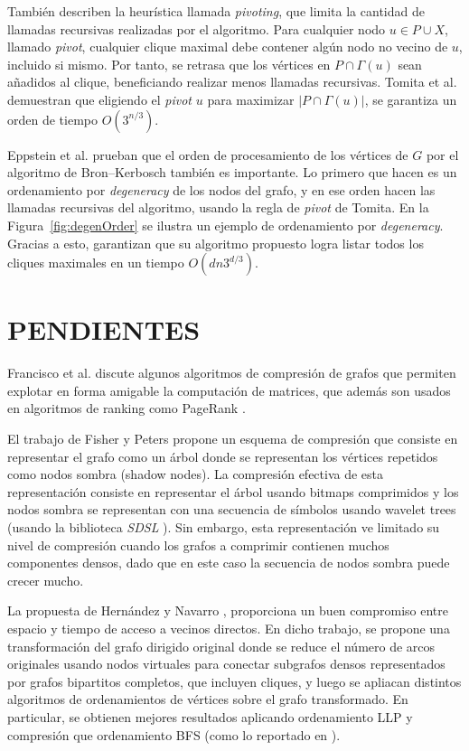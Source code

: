 También describen la heurística llamada \textit{pivoting}, que limita la cantidad de llamadas recursivas realizadas por el algoritmo. Para cualquier nodo $u \in P \cup X$, llamado \textit{pivot}, cualquier clique maximal debe contener algún nodo no vecino de $u$, incluido si mismo. Por tanto, se retrasa que los vértices en $P \cap \Gamma(u)$ sean añadidos al clique, beneficiando realizar menos llamadas recursivas. Tomita et al. \cite{tomita2006worst} demuestran que eligiendo el \textit{pivot} $u$ para maximizar $|P \cap \Gamma(u)|$, se garantiza un orden de tiempo $O(3^{n/3})$.

Eppstein et al. \cite{eppstein2010listing} prueban que el orden de procesamiento de los vértices de $G$ por el algoritmo de Bron–Kerbosch también es importante. Lo primero que hacen es un ordenamiento por \textit{degeneracy} de los nodos del grafo, y en ese orden hacen las llamadas recursivas del algoritmo, usando la regla de \textit{pivot} de Tomita. En la Figura~\ref{fig:degenOrder} se ilustra un ejemplo de ordenamiento por \textit{degeneracy}. Gracias a esto, garantizan que su algoritmo propuesto logra listar todos los cliques maximales en un tiempo $O(dn3^{d/3})$.





\section{PENDIENTES}


 Francisco et al. \cite{francisco2018exploiting} discute algunos algoritmos de compresión de grafos que permiten explotar en forma amigable la computación de matrices, que además son usados en algoritmos de ranking como PageRank \cite{page1999pagerank}.


El trabajo de Fisher y Peters \cite{FISCHER201639} propone un esquema de compresión que consiste en representar el grafo como un árbol donde se representan los vértices repetidos como nodos sombra (shadow nodes). La compresión efectiva de esta representación consiste en representar el árbol usando bitmaps comprimidos y los nodos sombra se representan con una secuencia de símbolos usando wavelet trees (usando la biblioteca \textit{SDSL} \cite{gbmp2014sea}). Sin embargo, esta representación ve limitado su nivel de compresión cuando los grafos a comprimir contienen muchos componentes densos, dado que en este caso la secuencia de nodos sombra puede crecer mucho.   

La propuesta de Hernández y Navarro \cite{tesisCecilia}, proporciona un buen compromiso entre espacio y tiempo de acceso a vecinos directos. En dicho trabajo, se propone una transformación del grafo dirigido original donde se reduce el número de arcos originales usando nodos virtuales para conectar subgrafos densos representados por grafos bipartitos completos, que incluyen cliques, y luego se apliacan distintos algoritmos de ordenamientos de vértices sobre el grafo transformado. En particular, se obtienen mejores resultados aplicando ordenamiento LLP y compresión \cite{boldi2011layered} que ordenamiento BFS (como lo reportado en \cite{Hernandez2014}).

